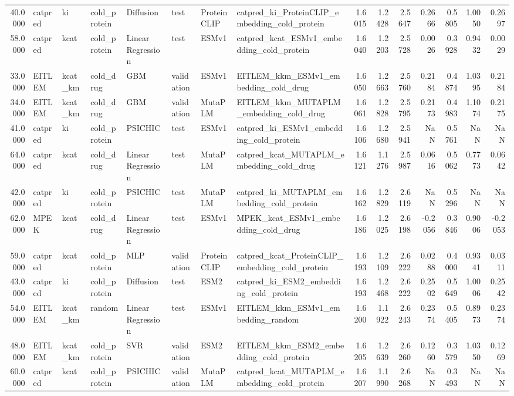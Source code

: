 \begin{tabular}{rlllllllrrrrrrr}
40.0000 & catpred & ki & cold_protein & Diffusion & test & ProteinCLIP & catpred_ki_ProteinCLIP_embedding_cold_protein & 1.6015 & 1.2428 & 2.5647 & 0.2666 & 0.5805 & 1.0050 & 0.2697 \\
58.0000 & catpred & kcat & cold_protein & Linear Regression & test & ESMv1 & catpred_kcat_ESMv1_embedding_cold_protein & 1.6040 & 1.2203 & 2.5728 & 0.0026 & 0.3928 & 0.9432 & 0.0029 \\
33.0000 & EITLEM & kcat_km & cold_drug & GBM & validation & ESMv1 & EITLEM_kkm_ESMv1_embedding_cold_drug & 1.6050 & 1.2663 & 2.5760 & 0.2184 & 0.4874 & 1.0395 & 0.2184 \\
34.0000 & EITLEM & kcat_km & cold_drug & GBM & validation & MutaPLM & EITLEM_kkm_MUTAPLM_embedding_cold_drug & 1.6061 & 1.2828 & 2.5795 & 0.2173 & 0.4983 & 1.1074 & 0.2175 \\
41.0000 & catpred & ki & cold_protein & PSICHIC & test & ESMv1 & catpred_ki_ESMv1_embedding_cold_protein & 1.6106 & 1.2680 & 2.5941 & NaN & 0.5761 & NaN & NaN \\
64.0000 & catpred & kcat & cold_drug & Linear Regression & test & MutaPLM & catpred_kcat_MUTAPLM_embedding_cold_drug & 1.6121 & 1.1276 & 2.5987 & 0.0616 & 0.5062 & 0.7773 & 0.0642 \\
42.0000 & catpred & ki & cold_protein & PSICHIC & test & MutaPLM & catpred_ki_MUTAPLM_embedding_cold_protein & 1.6162 & 1.2829 & 2.6119 & NaN & 0.5296 & NaN & NaN \\
62.0000 & MPEK & kcat & cold_drug & Linear Regression & test & ESMv1 & MPEK_kcat_ESMv1_embedding_cold_drug & 1.6186 & 1.2025 & 2.6198 & -0.2056 & 0.3846 & 0.9006 & -0.2053 \\
59.0000 & catpred & kcat & cold_protein & MLP & validation & ProteinCLIP & catpred_kcat_ProteinCLIP_embedding_cold_protein & 1.6193 & 1.2109 & 2.6222 & 0.0288 & 0.4000 & 0.9341 & 0.0311 \\
43.0000 & catpred & ki & cold_protein & Diffusion & test & ESM2 & catpred_ki_ESM2_embedding_cold_protein & 1.6193 & 1.2468 & 2.6222 & 0.2502 & 0.5649 & 1.0006 & 0.2542 \\
54.0000 & EITLEM & kcat_km & random & Linear Regression & test & ESMv1 & EITLEM_kkm_ESMv1_embedding_random & 1.6200 & 1.1922 & 2.6243 & 0.2374 & 0.5405 & 0.8973 & 0.2374 \\
48.0000 & EITLEM & kcat_km & cold_protein & SVR & validation & ESM2 & EITLEM_kkm_ESM2_embedding_cold_protein & 1.6205 & 1.2639 & 2.6260 & 0.1260 & 0.3579 & 1.0350 & 0.1269 \\
60.0000 & catpred & kcat & cold_protein & PSICHIC & validation & MutaPLM & catpred_kcat_MUTAPLM_embedding_cold_protein & 1.6207 & 1.1990 & 2.6268 & NaN & 0.3493 & NaN & NaN \\

\end{tabular}
